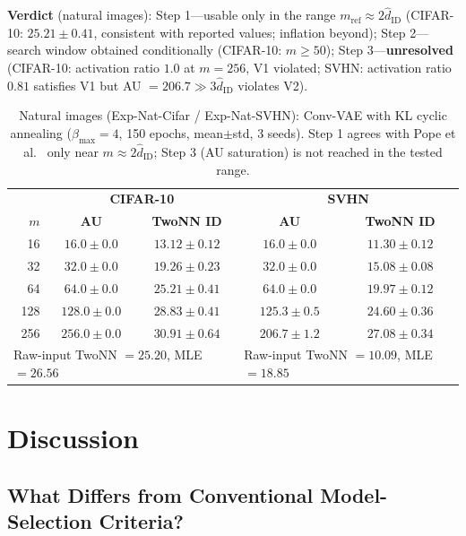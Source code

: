 \documentclass[make,article,submit,pdftex,moreauthors]{Definitions/mdpi}
\newcommand{\hatdID}{\hat{d}_{\mathrm{ID}}}
\begin{document}
\textbf{Verdict} (natural images):
Step 1---usable only in the range $m_{\mathrm{ref}} \approx 2\hatdID$
(CIFAR-10: $25.21 \pm 0.41$, consistent with reported values; inflation
beyond);
Step 2---search window obtained conditionally (CIFAR-10: $m \geq 50$);
Step 3---\textbf{unresolved} (CIFAR-10: activation ratio $1.0$ at $m = 256$,
V1 violated; SVHN: activation ratio $0.81$ satisfies V1 but
AU $= 206.7 \gg 3\hatdID$ violates V2).

\begin{table}[H]
\caption{Natural images (Exp-Nat-Cifar / Exp-Nat-SVHN): Conv-VAE with KL
cyclic annealing ($\beta_{\max} = 4$, 150 epochs, mean$\pm$std, 3 seeds).
Step 1 agrees with Pope et al.~\cite{pope2021intrinsic} only near
$m \approx 2\hatdID$; Step 3 (AU saturation) is not reached in the tested
range.}
\label{tab:natural}
\small
\begin{tabular}{r cc | cc}
\toprule
 & \multicolumn{2}{c|}{\textbf{CIFAR-10}} & \multicolumn{2}{c}{\textbf{SVHN}} \\
$m$ & \textbf{AU} & \textbf{TwoNN ID} & \textbf{AU} & \textbf{TwoNN ID} \\
\midrule
 16 & $16.0 \pm 0.0$ & $13.12 \pm 0.12$ & $16.0 \pm 0.0$ & $11.30 \pm 0.12$ \\
 32 & $32.0 \pm 0.0$ & $19.26 \pm 0.23$ & $32.0 \pm 0.0$ & $15.08 \pm 0.08$ \\
 64 & $64.0 \pm 0.0$ & $\mathbf{25.21 \pm 0.41}$ & $64.0 \pm 0.0$ & $19.97 \pm 0.12$ \\
128 & $128.0 \pm 0.0$ & $28.83 \pm 0.41$ & $125.3 \pm 0.5$ & $24.60 \pm 0.36$ \\
256 & $256.0 \pm 0.0$ & $30.91 \pm 0.64$ & $206.7 \pm 1.2$ & $27.08 \pm 0.34$ \\
\midrule
\multicolumn{3}{l|}{Raw-input TwoNN $= 25.20$, MLE $= 26.56$} &
\multicolumn{2}{l}{Raw-input TwoNN $= 10.09$, MLE $= 18.85$} \\
\bottomrule
\end{tabular}
\end{table}

\section{Discussion}\label{sec:discussion}

\subsection{What Differs from Conventional Model-Selection Criteria?}\label{sec:disc_model_selection}
\end{document}
